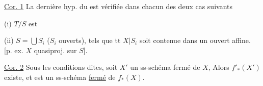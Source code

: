 \uline{Cor. 1} La dernière hyp. du  est vérifiée dans chacun des deux cas suivants

(i) $T/S$ est 

(ii) $S=\bigcup S_i$ ($S_i$ ouverts), tels que tt  $X\vert S_i$ soit contenue dans un ouvert affine.
[p. ex. $X$ quasiproj. sur $S$].

\uline{Cor. 2} Sous les conditions dites, soit $X'$ un ss-schéma fermé de $X$,  Alors $f'_*(X')$ existe, et est un ss-schéma \uline{fermé} de $f_*(X)$.
